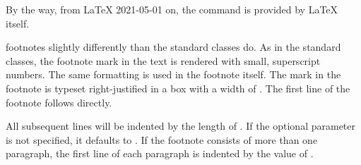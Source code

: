 %
By the way, from %
\LaTeX{} 2021-05-01 on, the command is provided by \LaTeX{} itself.%
\EndIndexGroup


\begin{Declaration}
\end{Declaration}%
 footnotes slightly
differently than the standard classes do. As in the standard classes, the
footnote mark in the text is rendered with small, superscript numbers. The
same formatting is used in the footnote itself. The mark in the footnote is
typeset right-justified in a box with a width of . The first
line of the footnote follows directly.

All subsequent lines will be indented by the length of . If the
optional parameter  is not specified, it defaults to
. If the footnote consists of more than one paragraph, the first
line of each paragraph is indented by the value of .

